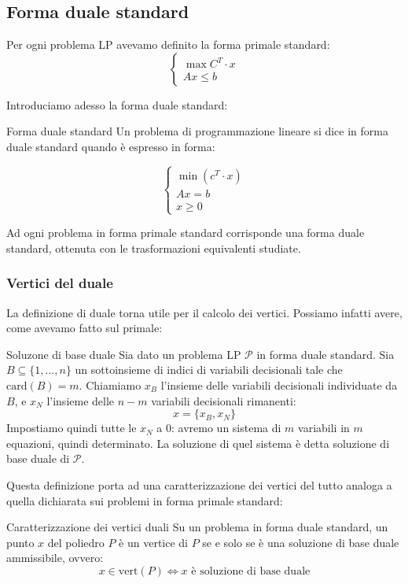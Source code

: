 \documentclass[a4paper,11pt]{article}
\begin{document}
\subsection{Forma duale standard}
Per ogni problema LP avevamo definito la forma primale standard:
\[
	\begin{cases}
		\max{C^T \cdot x} \\
		Ax \leq b
	\end{cases}
\]

Introduciamo adesso la forma duale standard:
\begin{definition}{Forma duale standard}
	Un problema di programmazione lineare si dice in forma duale standard quando è espresso in forma:
	
	\[
		\begin{cases}
			\min(c^T \cdot x) \\
			Ax = b \\
			x \geq 0
		\end{cases}
	\]

\end{definition}

Ad ogni problema in forma primale standard corrisponde una forma duale standard, ottenuta con le trasformazioni equivalenti studiate.

\subsubsection{Vertici del duale}
La definizione di duale torna utile per il calcolo dei vertici. 
Possiamo infatti avere, come avevamo fatto sul primale:
\begin{definition}{Soluzone di base duale}
	Sia dato un problema LP $\mathcal{P}$ in forma duale standard.
	Sia $B \subseteq \{ 1, ..., n \}$ un sottoinsieme di indici di variabili decisionali tale che $\mathrm{card}(B) = m$.
	Chiamiamo $x_B$ l'insieme delle variabili decisionali individuate da $B$, e $x_N$ l'insieme delle $n - m$ variabili decisionali rimanenti:
	$$ x = \{x_B, x_N\}$$
	Impostiamo quindi tutte le $x_N$ a 0: avremo un sistema di $m$ variabili in $m$ equazioni, quindi determinato.
	La soluzione di quel sistema è detta soluzione di base duale di $\mathcal{P}$.
\end{definition}

Questa definizione porta ad una caratterizzazione dei vertici del tutto analoga a quella dichiarata sui problemi in forma primale standard:

\begin{theorem}{Caratterizzazione dei vertici duali}
	Su un problema in forma duale standard, un punto $x$ del poliedro $P$ è un vertice di $P$ se e solo se è una soluzione di base duale ammissibile, ovvero:
	$$ 
	x \in \mathrm{vert}(P) \Leftrightarrow \text{$x$ è soluzione di base duale}
	$$
\end{theorem}
\end{document}

